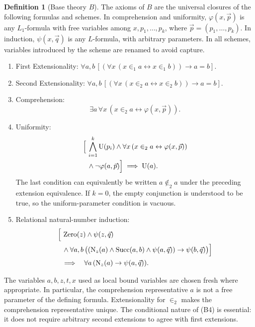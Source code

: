 \documentclass[11pt,a4paper]{article}
\numberwithin{equation}{section}
\theoremstyle{definition}
\newtheorem{definition}[theorem]{Definition}
\theoremstyle{remark}
\newcommand{\Unif}{\operatorname{U}}
\newcommand{\Zero}{\operatorname{Zero}}
\newcommand{\Succ}{\operatorname{Succ}}
\newcommand{\Nat}{\operatorname{N}}
\newcommand{\extone}{\in_1}
\newcommand{\exttwo}{\in_2}
\begin{document}
\begin{definition}[Base theory $B$]\label{def:base}
The axioms of $B$ are the universal closures of the following formulas and schemes. In comprehension and uniformity, $\varphi(x,\vec p)$ is any $L_1$-formula with free variables among $x,p_1,\ldots,p_k$, where $\vec p=(p_1,\ldots,p_k)$. In induction, $\psi(x,\vec q)$ is any $L$-formula, with arbitrary parameters. In all schemes, variables introduced by the scheme are renamed to avoid capture.
\begin{enumerate}[label=\textnormal{(B\arabic*)}]
\item First Extensionality: $\forall a,b\,[(\forall x\,(x\extone a\leftrightarrow x\extone b))\to a=b]$.
\item Second Extensionality: $\forall a,b\,[(\forall x\,(x\exttwo a\leftrightarrow x\exttwo b))\to a=b]$.
\item Comprehension:
\[\exists a\,\forall x\,(x\exttwo a\leftrightarrow\varphi(x,\vec p)).\]
\item Uniformity:
\[
\begin{aligned}
\Bigl[\,&\bigwedge_{i=1}^{k}\Unif(p_i)
   \land \forall x\,(x\exttwo a\leftrightarrow\varphi(x,\vec p))\\
 &{}\land\neg\varphi(a,\vec p)\Bigr]
 \;\Longrightarrow\;\Unif(a).
\end{aligned}
\]
The last condition can equivalently be written $a\notin_2 a$ under the preceding extension equivalence. If $k=0$, the empty conjunction is understood to be true, so the uniform-parameter condition is vacuous.
\item Relational natural-number induction:
\[
\begin{aligned}
\Bigl[\,&\Zero(z)\land\psi(z,\vec q)\\
 &{}\land\forall a,b\,\bigl((\Nat_z(a)\land\Succ(a,b)\land\psi(a,\vec q))
    \to\psi(b,\vec q)\bigr)\Bigr]\\
 &\Longrightarrow\quad \forall a\,(\Nat_z(a)\to\psi(a,\vec q)).
\end{aligned}
\]
\end{enumerate}
\end{definition}
The variables $a,b,z,t,x$ used as local bound variables are chosen fresh where appropriate. In particular, the comprehension representative $a$ is not a free parameter of the defining formula. Extensionality for $\exttwo$ makes the comprehension representative unique. The conditional nature of (B4) is essential: it does not require arbitrary second extensions to agree with first extensions.
\end{document}
